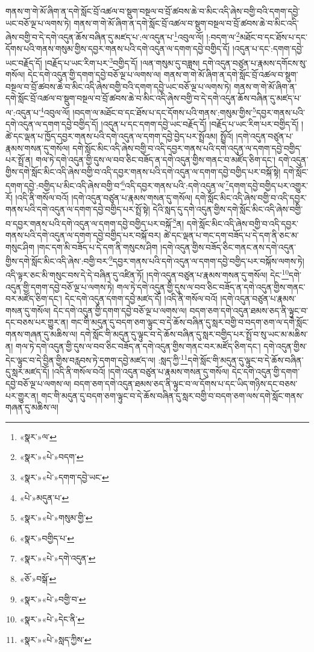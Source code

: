 གནས་ག་གེ་མོ་ཞིག་ན་དགེ་སློང་བྲོ་འཚལ་བ་སྡུག་བསྔལ་བ་བྲོ་ཚབས་ཆེ་བ་མིང་འདི་ཞེས་བགྱི་བའི་དགག་དབྱེ་ཡང་བཅོ་ལྔ་པ་ལགས་ཏེ། གནས་ག་གེ་མོ་ཞིག་ན་དགེ་སློང་བྲོ་འཚལ་བ་སྡུག་བསྔལ་བ་བྲོ་ཚབས་ཆེ་བ་མིང་འདི་ཞེས་བགྱི་བ་དེ་དགེ་འདུན་ཆོས་བཞིན་དུ་མཛད་པ་:ལ་འདུན་པ་\footnote{«སྣར་»ལ་}འབུལ་ལོ། །:བདག་ལ་\footnote{«སྣར་»«པེ་»བདག་}མཐོང་བ་དང་ཐོས་པ་དང་དོགས་པའི་གནས་གསུམ་གྱིས་དབྱར་གནས་པའི་དགེ་འདུན་ལ་དགག་དབྱེ་བགྱིད་དོ། །འདུན་པ་དང་:དགག་དབྱེ་ཡང་བརྗོད་དོ། །བརྗོད་པ་ཡང་རིག་པར་\footnote{«སྣར་»«པེ་»དགག་དབྱེ་ཡང་}བགྱིད་དོ། །ལན་གསུམ་དུ་བཟླས། དགེ་འདུན་བཙུན་པ་རྣམས་དགོངས་སུ་གསོལ། དེང་དགེ་འདུན་གྱི་དགག་དབྱེ་བཅོ་ལྔ་པ་ལགས་ལ། གནས་ག་གེ་མོ་ཞིག་ན་དགེ་སློང་བྲོ་འཚལ་བ་སྡུག་བསྔལ་བ་བྲོ་ཚབས་ཆེ་བ་མིང་འདི་ཞེས་བགྱི་བའི་དགག་དབྱེ་ཡང་བཅོ་ལྔ་པ་ལགས་ཏེ། གནས་ག་གེ་མོ་ཞིག་ན་དགེ་སློང་བྲོ་འཚལ་བ་སྡུག་བསྔལ་བ་བྲོ་ཚབས་ཆེ་བ་མིང་འདི་ཞེས་བགྱི་བ་དེ་དགེ་འདུན་ཆོས་བཞིན་དུ་མཛད་པ་ལ་:འདུན་པ་\footnote{«པེ་»མདུན་པ་}འབུལ་ལོ། །བདག་ལ་མཐོང་བ་དང་ཐོས་པ་དང་དོགས་པའི་གནས་:གསུམ་གྱིས་\footnote{«སྣར་»«པེ་»གསུམ་གྱི་}དབྱར་གནས་པའི་དགེ་འདུན་ལ་དགག་དབྱེ་བགྱིད་དོ། །འདུན་པ་དང་དགག་དབྱེ་ཡང་བརྗོད་དོ། །བརྗོད་པ་ཡང་རིག་པར་བགྱིད་དོ། །ཚེ་དང་ལྡན་པ་ཁྱོད་དབྱར་གནས་པའི་དགེ་འདུན་ལ་དགག་དབྱེ་བྱེད་པར་སྤྲོའམ། སྤྲོའོ། །དགེ་འདུན་བཙུན་པ་རྣམས་གསན་དུ་གསོལ། དགེ་སློང་མིང་འདི་ཞེས་བགྱི་བ་འདི་དབྱར་གནས་པའི་དགེ་འདུན་ལ་དགག་དབྱེ་བགྱིད་པར་སྤྲོ་ན། གལ་ཏེ་དགེ་འདུན་གྱི་དུས་ལ་བབ་ཅིང་བཟོད་ན་དགེ་འདུན་གྱིས་གནང་བ་མཛོད་ཅིག་དང་། དགེ་འདུན་གྱིས་དགེ་སློང་མིང་འདི་ཞེས་བགྱི་བ་འདི་དབྱར་གནས་པའི་དགེ་འདུན་ལ་དགག་དབྱེ་བགྱིད་པར་བསྐོ་སྟེ། དགེ་སློང་དགག་དབྱེ་:བགྱིད་པ་མིང་འདི་ཞེས་བགྱི་བ་\footnote{«སྣར་»བགྱིད་པ་}འདི་དབྱར་གནས་པའི་:དགེ་འདུན་ལ་\footnote{«སྣར་»«པེ་»དགེ་འདུན་}དགག་དབྱེ་བགྱིད་པར་འགྱུར་རོ། །འདི་ནི་གསོལ་བའོ། །དགེ་འདུན་བཙུན་པ་རྣམས་གསན་དུ་གསོལ། དགེ་སློང་མིང་འདི་ཞེས་བགྱི་བ་འདི་དབྱར་གནས་པའི་དགེ་འདུན་ལ་དགག་དབྱེ་བགྱིད་པར་སྤྲོ་སྟེ། དེའི་སླད་དུ་དགེ་འདུན་གྱིས་དགེ་སློང་མིང་འདི་ཞེས་བགྱི་བ་དབྱར་གནས་པའི་དགེ་འདུན་ལ་དགག་དབྱེ་བགྱིད་པར་བསྐོ་\footnote{«ཅོ་»བསྒོ་}ན། དགེ་སློང་མིང་འདི་ཞེས་བགྱི་བ་འདི་དབྱར་གནས་པའི་དགེ་འདུན་ལ་དགག་དབྱེ་བགྱིད་པར་བསྐོ་བར། ཚེ་དང་ལྡན་པ་གང་དག་བཟོད་པ་དེ་དག་ནི་ཅང་མ་གསུང་ཤིག །གང་དག་མི་བཟོད་པ་དེ་དག་ནི་གསུངས་ཤིག །དགེ་འདུན་གྱིས་བཟོད་ཅིང་གནང་ནས་དགེ་འདུན་གྱིས་དགེ་སློང་མིང་འདི་ཞེས་:བགྱི་བར་\footnote{«སྣར་»«པེ་»བགྱི་བ་}དབྱར་གནས་པའི་དགེ་འདུན་ལ་དགག་དབྱེ་བགྱིད་པར་བསྐོས་ལགས་ཏེ། འདི་ལྟར་ཅང་མི་གསུང་བས་དེ་དེ་བཞིན་དུ་འཛིན་ཏོ། །དགེ་འདུན་བཙུན་པ་རྣམས་གསན་དུ་གསོལ། དེང་\footnote{«སྣར་»«པེ་»དེང་ནི་}དགེ་འདུན་གྱི་དགག་དབྱེ་བཅོ་ལྔ་པ་ལགས་ཏེ། གལ་ཏེ་དགེ་འདུན་གྱི་དུས་ལ་བབ་ཅིང་བཟོད་ན་དགེ་འདུན་གྱིས་གནང་བར་མཛོད་ཅིག་དང་། དེང་དགེ་འདུན་དགག་དབྱེ་མཛད་དོ། །འདི་ནི་གསོལ་བའོ། །དགེ་འདུན་བཙུན་པ་རྣམས་གསན་དུ་གསོལ། དེང་དགེ་འདུན་གྱི་དགག་དབྱེ་བཅོ་ལྔ་པ་ལགས་ལ། བདག་ཅག་དགེ་འདུན་ཐམས་ཅད་ནི་ལྟུང་བ་དང་བཅས་པར་གྱུར་ན། གང་གི་མདུན་དུ་བདག་ཅག་ལྟུང་བ་དེ་ཆོས་བཞིན་དུ་སླར་བགྱི་བ་བདག་ཅག་ལ་དགེ་སློང་གནས་གཞན་དུ་མཆིས་ལ། དགེ་སློང་གི་མདུན་དུ་ལྟུང་བ་དེ་ཆོས་བཞིན་དུ་སླར་བགྱིད་པར་སྤྲོ་བ་སུ་ཡང་མ་མཆིས་ན། གལ་ཏེ་དགེ་འདུན་གྱི་དུས་ལ་བབ་ཅིང་བཟོད་ན་དགེ་འདུན་གྱིས་གནང་བར་མཛོད་ཅིག་དང་། དགེ་འདུན་གྱིས་དེང་ལྟུང་བ་དེ་བྱིན་གྱིས་བརླབས་ཏེ་དགག་དབྱེ་མཛད་ལ། :སླད་ཀྱི་\footnote{«སྣར་»«པེ་»སླད་ཀྱིས་}དགེ་སློང་གི་མདུན་དུ་ལྟུང་བ་དེ་ཆོས་བཞིན་དུ་སླར་མཛད་དོ། །འདི་ནི་གསོལ་བའོ། །དགེ་འདུན་བཙུན་པ་རྣམས་གསན་དུ་གསོལ། དེང་དགེ་འདུན་གྱི་དགག་དབྱེ་བཅོ་ལྔ་པ་ལགས་ལ། བདག་ཅག་དགེ་འདུན་ཐམས་ཅད་ནི་ལྟུང་བ་ལ་དོགས་པ་དང་ཡིད་གཉིས་དང་བཅས་པར་གྱུར་ན། གང་གི་མདུན་དུ་བདག་ཅག་ལྟུང་བ་དེ་ཆོས་བཞིན་དུ་སླར་བགྱི་བ་བདག་ཅག་ལས་དགེ་སློང་གནས་གཞན་དུ་མཆིས་ལ། 